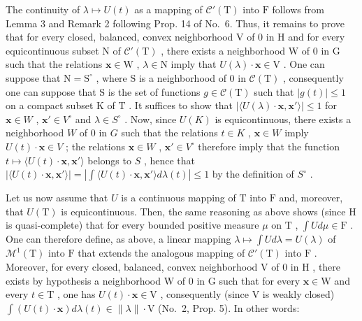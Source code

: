 The continuity of \(\lambda \mapsto U(t)\) as a mapping of \(\mathcal{C}'(\mathrm{T})\) into \(\mathrm{F}\) follows from Lemma 3 and Remark 2 following Prop. 14 of No.~6. Thus, it remains to prove that for every closed, balanced, convex neighborhood \(\mathrm{V}\) of 0 in \(\mathrm{H}\) and for every equicontinuous subset \(\mathrm{N}\) of \(\mathcal{C}'(\mathrm{T})\) , there exists a neighborhood \(\mathrm{W}\) of 0 in \(\mathrm{G}\) such that the relations \(\mathbf{x} \in \mathrm{W}\) , \(\lambda \in \mathrm{N}\) imply that \(U(\lambda) \cdot \mathbf{x} \in \mathrm{V}\) . One can suppose that \(\mathrm{N} = \mathrm{S}^{\circ}\) , where \(\mathrm{S}\) is a neighborhood of 0 in \(\mathcal{C}(\mathrm{T})\) , consequently one can suppose that \(\mathrm{S}\) is the set of functions \(g \in \mathcal{C}(\mathrm{T})\) such that \(|g(t)| \leqslant 1\) on a compact subset \(\mathrm{K}\) of \(\mathrm{T}\) . It suffices to show that \(|\langle U(\lambda) \cdot \mathbf{x}, \mathbf{x}' \rangle| \leqslant 1\) for \(\mathbf{x} \in W\) , \(\mathbf{x}' \in V^\circ\) and \(\lambda \in S^\circ\) . Now, since \(U(K)\) is equicontinuous, there exists a neighborhood \(W\) of 0 in \(G\) such that the relations \(t \in K\) , \(\mathbf{x} \in W\) imply \(U(t) \cdot \mathbf{x} \in V\) ; the relations \(\mathbf{x} \in W\) , \(\mathbf{x}' \in V^\circ\) therefore imply that the function \(t \mapsto \langle U(t) \cdot \mathbf{x}, \mathbf{x}' \rangle\) belongs to \(S\) , hence that \(|\langle U(t) \cdot \mathbf{x}, \mathbf{x}' \rangle| = |\int\langle U(t) \cdot \mathbf{x}, \mathbf{x}' \rangle d\lambda(t)| \leqslant 1\) by the definition of \(S^\circ\) .

Let us now assume that \(U\) is a continuous mapping of \(\mathrm{T}\) into \(\mathrm{F}\) and, moreover, that \(U(\mathrm{T})\) is equicontinuous. Then, the same reasoning as above shows (since \(\mathrm{H}\) is quasi-complete) that for every bounded positive measure \(\mu\) on \(\mathrm{T}\) , \(\int U d\mu \in \mathrm{F}\) . One can therefore define, as above, a linear mapping \(\lambda \mapsto \int U d\lambda = U(\lambda)\) of \(\mathcal{M}^1(\mathrm{T})\) into \(\mathrm{F}\) that extends the analogous mapping of \(\mathcal{C}'(\mathrm{T})\) into \(\mathrm{F}\) . Moreover, for every closed, balanced, convex neighborhood \(\mathrm{V}\) of 0 in \(\mathrm{H}\) , there exists by hypothesis a neighborhood \(\mathrm{W}\) of 0 in \(\mathrm{G}\) such that for every \(\mathbf{x} \in \mathrm{W}\) and every \(t \in \mathrm{T}\) , one has \(U(t) \cdot \mathbf{x} \in \mathrm{V}\) , consequently (since \(\mathrm{V}\) is weakly closed) \(\int (U(t) \cdot \mathbf{x}) d\lambda(t) \in \| \lambda \| \cdot \mathrm{V}\) (No.~2, Prop. 5). In other words:

